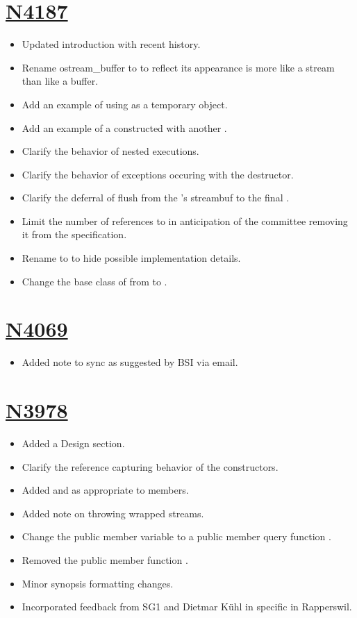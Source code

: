 \documentclass[ebook,11pt,article]{memoir}
\begin{document}
\section{\href{https://wg21.link/N4187}{N4187}}
\begin{itemize}
\item Updated introduction with recent history.
\item Rename ostream_buffer to  to reflect its appearance is more like a stream than like a buffer.
\item Add an example of using  as a temporary object.
\item Add an example of a  constructed with another .
\item Clarify the behavior of nested  executions.
\item Clarify the behavior of exceptions occuring with the  destructor.
\item Clarify the deferral of flush from the 's streambuf to the final .
\item Limit the number of references to  in anticipation of the committee removing it from the specification.
\item Rename  to  to hide possible implementation details.
\item Change the base class of  from  to .
\end{itemize}
\section{\href{https://wg21.link/N4069}{N4069}}
\begin{itemize}
\item Added note to sync as suggested by BSI via email.
\end{itemize}

\section{\href{https://wg21.link/N3978}{N3978}}
\begin{itemize}
\item Added a Design section.
\item Clarify the reference capturing behavior of the  constructors.
\item Added  and  as appropriate to members.
\item Added note on throwing wrapped streams.
\item Change the  public member variable  to a public member query function .
\item Removed the public member function .
\item Minor synopsis formatting changes.
\item Incorporated feedback from SG1 and Dietmar K\"uhl in specific in Rapperswil.
\end{itemize}
\end{document}

